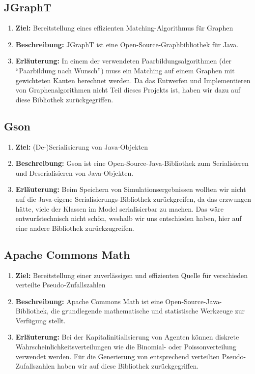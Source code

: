 \documentclass[parskip=full,11pt]{scrartcl}
\begin{document}
\subsection{JGraphT}
\begin{enumerate}
\item[] \textbf{Ziel:} Bereitstellung eines effizienten Matching-Algorithmus für Graphen
\item[] \textbf{Beschreibung:} JGraphT ist eine Open-Source-Graphbibliothek für Java.
\item[] \textbf{Erläuterung:} In einem der verwendeten Paarbildungsalgorithmen (der \enquote{Paarbildung nach Wunsch}) muss ein Matching auf einem Graphen mit gewichteten Kanten berechnet werden. Da das Entwerfen und Implementieren von Graphenalgorithmen nicht Teil dieses Projekts ist, haben wir dazu auf diese Bibliothek zurückgegriffen.
\end{enumerate}
\subsection{Gson}
\begin{enumerate}
\item[] \textbf{Ziel:} (De-)Serialisierung von Java-Objekten
\item[] \textbf{Beschreibung:} Gson ist eine Open-Source-Java-Bibliothek zum Serialisieren und Deserialisieren von Java-Objekten.
\item[] \textbf{Erläuterung:} Beim Speichern von Simulationsergebnissen wollten wir nicht auf die Java-eigene Serialisierungs-Bibliothek zurückgreifen, da das erzwungen hätte, viele der Klassen im Model serialisierbar zu machen. Das wäre entwurfstechnisch nicht schön, weshalb wir uns entschieden haben, hier auf eine andere Bibliothek zurückzugreifen.
\end{enumerate}
\subsection{Apache Commons Math}
\begin{enumerate}
\item[] \textbf{Ziel:}  Bereitstellung einer zuverlässigen und effizienten Quelle für verschieden verteilte Pseudo-Zufallszahlen
\item[] \textbf{Beschreibung:} Apache Commons Math ist eine Open-Source-Java-Bibliothek, die grundlegende mathematische und statistische Werkzeuge zur Verfügung stellt.
\item[] \textbf{Erläuterung:} Bei der Kapitalinitialisierung von Agenten können diskrete Wahrscheinlichkeitsverteilungen wie die Binomial- oder Poissonverteilung verwendet werden. Für die Generierung von entsprechend verteilten Pseudo-Zufallszahlen haben wir auf diese Bibliothek zurückgegriffen.
\end{enumerate}
\end{document}
